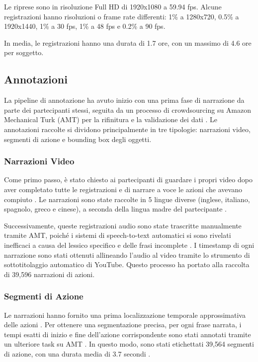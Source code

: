 Le riprese sono in risoluzione Full HD di 1920x1080 a 59.94 fps. Alcune registrazioni hanno risoluzioni o frame rate differenti: 1\% a 1280x720, 0.5\% a 1920x1440, 1\% a 30 fps, 1\% a 48 fps e 0.2\% a 90 fps.

In media, le registrazioni hanno una durata di 1.7 ore, con un massimo di 4.6 ore per soggetto.

\subsection*{Annotazioni}
La pipeline di annotazione ha avuto inizio con una prima fase di narrazione da parte dei partecipanti stessi, seguita da un processo di crowdsourcing su Amazon Mechanical Turk (AMT) \cite{mturk} per la rifinitura e la validazione dei dati \cite{Damen2021PAMI}. Le annotazioni raccolte si dividono principalmente in tre tipologie: narrazioni video, segmenti di azione e bounding box degli oggetti.

\subsubsection* {Narrazioni Video}
Come primo passo, è stato chiesto ai partecipanti di guardare i propri video dopo aver completato tutte le registrazioni e di narrare a voce le azioni che avevano compiuto \cite{Damen2021PAMI}. Le narrazioni sono state raccolte in 5 lingue diverse (inglese, italiano, spagnolo, greco e cinese), a seconda della lingua madre del partecipante \cite{Damen2021PAMI}.

Successivamente, queste registrazioni audio sono state trascritte manualmente tramite AMT, poiché i sistemi di speech-to-text automatici \cite{google_speech,ibm_watson,cmu_sphinx} si sono rivelati inefficaci a causa del lessico specifico e delle frasi incomplete \cite{Damen2021PAMI}. I timestamp di ogni narrazione sono stati ottenuti allineando l'audio al video tramite lo strumento di sottotitolaggio automatico di YouTube. Questo processo ha portato alla raccolta di 39,596 narrazioni di azioni.

\subsubsection* {Segmenti di Azione}
Le narrazioni hanno fornito una prima localizzazione temporale approssimativa delle azioni \cite{Damen2021PAMI}. Per ottenere una segmentazione precisa, per ogni frase narrata, i tempi esatti di inizio e fine dell'azione corrispondente sono stati annotati tramite un ulteriore task su AMT \cite{Damen2021PAMI}. In questo modo, sono stati etichettati 39,564 segmenti di azione, con una durata media di 3.7 secondi \cite{Damen2021PAMI}.

